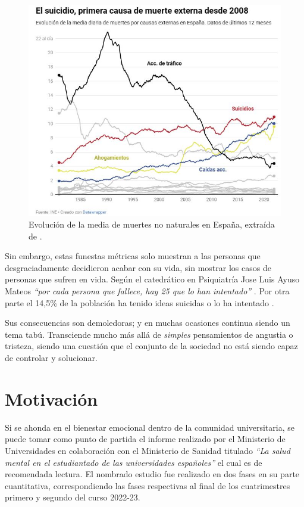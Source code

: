     \begin{figure}[h]
        \centering
        \includegraphics[width=0.85\linewidth]{figures/causas no naturales.jpg}
        \caption[Evolución de la media de muertes no naturales en España]{Evolución de la media de muertes no naturales en España, extraída de \cite{sanchez_once_2023}.}
        \label{fig:intro:causas_no_naturales}
    \end{figure}

     Sin embargo, estas funestas métricas solo muestran a las personas que desgraciadamente decidieron acabar con su vida, sin mostrar los casos de personas que sufren en vida. Según el catedrático en Psiquiatría Jose Luis Ayuso Mateos \textit{``por cada persona que fallece, hay 25 que lo han intentado''}  \cite{sanchez_once_2023}.  Por otra parte el 14,5\% de la población ha tenido ideas suicidas o lo ha intentado \cite{confederacion_salud_mental_espana_cuatro_2023}.

    Sus consecuencias son demoledoras; y en muchas ocasiones continua siendo un tema tabú. Transciende mucho más allá de \textit{simples} pensamientos de angustia o tristeza, siendo una cuestión que el conjunto de la sociedad no está siendo capaz de controlar y solucionar.
    
\section{Motivación}

    Si se ahonda en el bienestar emocional dentro de la comunidad universitaria, se puede tomar como punto de partida el informe realizado por el Ministerio de Universidades en colaboración con el Ministerio de Sanidad titulado \textit{``La salud mental en el estudiantado de las universidades españoles''} \cite{galache_gobierno_2023} \cite{ministerio_de_universidades_salud_2023} el cual es de recomendada lectura. El nombrado estudio fue realizado en dos fases en su parte cuantitativa, correspondiendo las fases respectivas al final de los cuatrimestres primero y segundo del curso 2022-23. 
    
